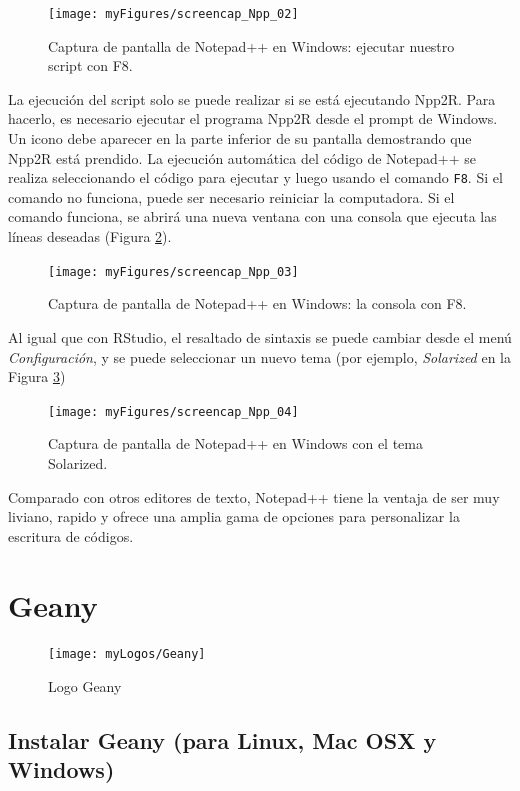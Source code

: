 \documentclass[
]{book}
\begin{document}
\begin{figure}
\texttt{[image: myFigures/screencap\_Npp\_02]} \caption{Captura de pantalla de Notepad++ en Windows: ejecutar nuestro script con F8.\label{fig:screenCapNpp02}}\label{fig:screenCapNpp02}
\end{figure}

La ejecución del script solo se puede realizar si se está ejecutando Npp2R. Para hacerlo, es necesario ejecutar el programa Npp2R desde el prompt de Windows. Un icono debe aparecer en la parte inferior de su pantalla demostrando que Npp2R está prendido. La ejecución automática del código de Notepad++ se realiza seleccionando el código para ejecutar y luego usando el comando \texttt{F8}. Si el comando no funciona, puede ser necesario reiniciar la computadora. Si el comando funciona, se abrirá una nueva ventana con una consola que ejecuta las líneas deseadas (Figura \ref{fig:screenCapNpp03}).

\begin{figure}
\texttt{[image: myFigures/screencap\_Npp\_03]} \caption{Captura de pantalla de Notepad++ en Windows: la consola con F8.\label{fig:screenCapNpp03}}\label{fig:screenCapNpp03}
\end{figure}

Al igual que con RStudio, el resaltado de sintaxis se puede cambiar desde el menú \emph{Configuración}, y se puede seleccionar un nuevo tema (por ejemplo, \emph{Solarized} en la Figura \ref{fig:screenCapNpp04})

\begin{figure}
\texttt{[image: myFigures/screencap\_Npp\_04]} \caption{Captura de pantalla de Notepad++ en Windows con el tema Solarized.\label{fig:screenCapNpp04}}\label{fig:screenCapNpp04}
\end{figure}

Comparado con otros editores de texto, Notepad++ tiene la ventaja de ser muy liviano, rapido y ofrece una amplia gama de opciones para personalizar la escritura de códigos.

\hypertarget{geany}{%
\section{Geany}\label{geany}}

\begin{figure}
\texttt{[image: myLogos/Geany]} \caption{Logo Geany\label{fig:logoGeany}}\label{fig:logoGeany}
\end{figure}

\hypertarget{instalar-geany-para-linux-mac-osx-y-windows}{%
\subsection{Instalar Geany (para Linux, Mac OSX y Windows)}\label{instalar-geany-para-linux-mac-osx-y-windows}}
\end{document}
